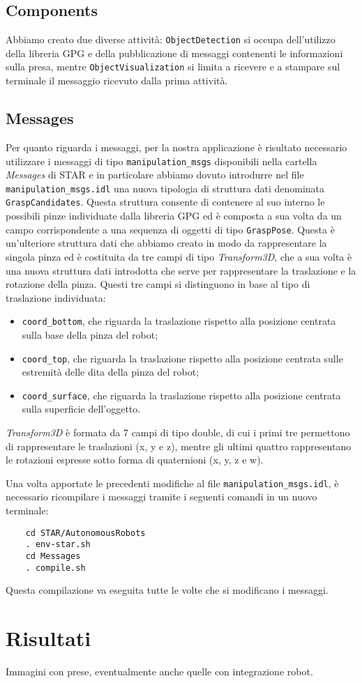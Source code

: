 \documentclass{report}
\begin{document}
\section{Components}
Abbiamo creato due diverse attività: \texttt{ObjectDetection} si occupa dell'utilizzo della libreria GPG e della pubblicazione di messaggi contenenti le informazioni sulla presa, mentre \texttt{ObjectVisualization} si limita a ricevere e a stampare sul terminale il messaggio ricevuto dalla prima attività.
\section{Messages}
Per quanto riguarda i messaggi, per la nostra applicazione è risultato necessario utilizzare i messaggi di tipo \texttt{manipulation\_msgs} disponibili nella cartella \textit{Messages} di STAR e in particolare abbiamo dovuto introdurre nel file \texttt{manipulation\_msgs.idl} una nuova tipologia di struttura dati denominata \texttt{GraspCandidates}. Questa struttura consente di contenere al suo interno le possibili pinze individuate dalla libreria GPG ed è composta a sua volta da un campo corrispondente a una sequenza di oggetti di tipo \texttt{GraspPose}. Questa è un'ulteriore struttura dati che abbiamo creato in modo da rappresentare la singola pinza ed è costituita da tre campi di tipo \textit{Transform3D}, che a sua volta è una nuova struttura dati introdotta che serve per rappresentare la traslazione e la rotazione della pinza. Questi tre campi si distinguono in base al tipo di traslazione individuata:
\begin{itemize}
	\item \texttt{coord\_bottom}, che riguarda la traslazione rispetto alla posizione centrata sulla base della pinza del robot;
	\item \texttt{coord\_top}, che riguarda la traslazione rispetto alla posizione centrata sulle estremità delle dita della pinza del robot;
	\item \texttt{coord\_surface}, che riguarda la traslazione rispetto alla posizione centrata sulla superficie dell'oggetto.
\end{itemize}
\textit{Transform3D} è formata da 7 campi di tipo double, di cui i primi tre permettono di rappresentare le traslazioni (x, y e z), mentre gli ultimi quattro rappresentano le rotazioni espresse sotto forma di quaternioni (x, y, z e w). \par
Una volta apportate le precedenti modifiche al file \texttt{manipulation\_msgs.idl}, è necessario ricompilare i messaggi tramite i seguenti comandi in un nuovo terminale:
\begin{verbatim}
	cd STAR/AutonomousRobots
	. env-star.sh
	cd Messages
	. compile.sh
\end{verbatim}
Questa compilazione va eseguita tutte le volte che si modificano i messaggi.

\newpage
\chapter{Risultati}\label{risultati}
Immagini con prese, eventualmente anche quelle con integrazione robot.
\end{document}
